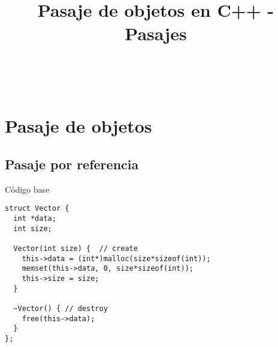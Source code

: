 


\title%
{Pasaje de objetos en C++ - Pasajes}

\subject{Pasaje de objetos en C++ - Pasajes}





\begin{frame}
   \titlepage
\end{frame}


~%
\section{Pasaje de objetos}
\subsection{Pasaje por referencia}
\begin{frame}[fragile]{C\'odigo base}
        \begin{lstlisting}[style=normal,firstnumber=1]
struct Vector {
  int *data;
  int size;

  Vector(int size) {  // create
    this->data = (int*)malloc(size*sizeof(int));
    memset(this->data, 0, size*sizeof(int));
    this->size = size;
  }

  ~Vector() { // destroy
    free(this->data);
  }
};
        \end{lstlisting}
\end{frame}

